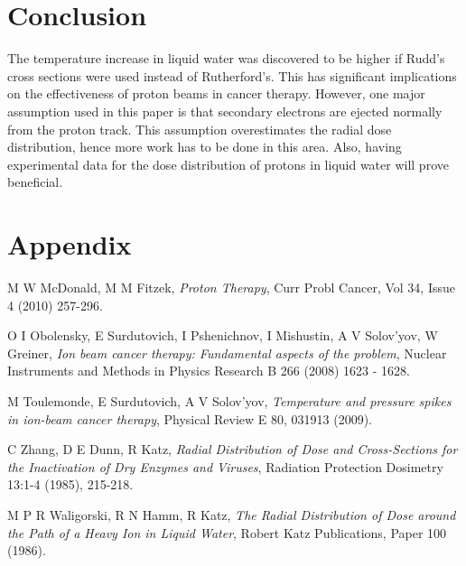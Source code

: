 \documentclass{article}
\begin{document}
\begin{multicols}{2}
\section {Conclusion}
The temperature increase in liquid water was discovered to be higher if Rudd's cross sections were used instead of Rutherford's. This has significant implications on the effectiveness of proton beams in cancer therapy. However, one major assumption used in this paper is that secondary electrons are ejected normally from the proton track. This assumption overestimates the radial dose distribution, hence more work has to be done in this area. Also, having experimental data for the dose distribution of protons in liquid water will prove beneficial. 


\section {Appendix}



\begin{thebibliography}{9} 
\small

 M W McDonald, M M Fitzek, \textit{Proton Therapy}, Curr Probl Cancer, Vol 34, Issue 4 (2010) 257-296.

 O I Obolensky, E Surdutovich, I Pshenichnov, I Mishustin, A V Solov'yov, W Greiner, \textit{Ion beam cancer therapy: Fundamental aspects of the problem}, Nuclear Instruments and Methods in Physics Research B 266 (2008) 1623 - 1628.  

 M Toulemonde, E Surdutovich, A V Solov'yov, \textit{Temperature and pressure spikes in ion-beam cancer therapy}, Physical Review E 80, 031913 (2009). 

 C Zhang, D E Dunn, R Katz, \textit{Radial Distribution of Dose and Cross-Sections for the Inactivation of Dry Enzymes and Viruses}, Radiation Protection Dosimetry 13:1-4 (1985), 215-218.

 M P R Waligorski, R N Hamm, R Katz, \textit{The Radial Distribution of Dose around the Path of a Heavy Ion in Liquid Water}, Robert Katz Publications, Paper 100 (1986). 


\end{thebibliography}
\end{multicols}
\end{document}

